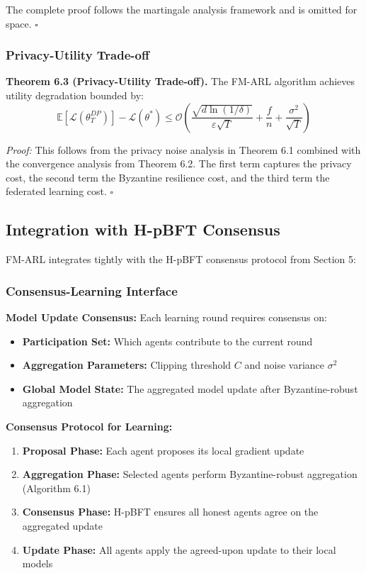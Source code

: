 \documentclass[conference]{IEEEtran}
\newcommand{\bigO}{\mathcal{O}}
\newcommand{\epsilon}{\varepsilon}
\begin{document}
The complete proof follows the martingale analysis framework and is omitted for space. $\square$

\subsubsection{Privacy-Utility Trade-off}

\textbf{Theorem 6.3 (Privacy-Utility Trade-off).} The FM-ARL algorithm achieves utility degradation bounded by:
\begin{equation}
\mathbb{E}[\mathcal{L}(\theta_T^{DP})] - \mathcal{L}(\theta^*) \leq \bigO\left(\frac{\sqrt{d \ln(1/\delta)}}{\epsilon \sqrt{T}} + \frac{f}{n} + \frac{\sigma^2}{\sqrt{T}}\right)
\end{equation}

\textit{Proof:} This follows from the privacy noise analysis in Theorem 6.1 combined with the convergence analysis from Theorem 6.2. The first term captures the privacy cost, the second term the Byzantine resilience cost, and the third term the federated learning cost. $\square$

\subsection{Integration with H-pBFT Consensus}

FM-ARL integrates tightly with the H-pBFT consensus protocol from Section 5:

\subsubsection{Consensus-Learning Interface}

\textbf{Model Update Consensus:} Each learning round requires consensus on:
\begin{itemize}
    \item \textbf{Participation Set:} Which agents contribute to the current round
    \item \textbf{Aggregation Parameters:} Clipping threshold $C$ and noise variance $\sigma^2$
    \item \textbf{Global Model State:} The aggregated model update after Byzantine-robust aggregation
\end{itemize}

\textbf{Consensus Protocol for Learning:}
\begin{enumerate}
    \item \textbf{Proposal Phase:} Each agent proposes its local gradient update
    \item \textbf{Aggregation Phase:} Selected agents perform Byzantine-robust aggregation (Algorithm 6.1)
    \item \textbf{Consensus Phase:} H-pBFT ensures all honest agents agree on the aggregated update
    \item \textbf{Update Phase:} All agents apply the agreed-upon update to their local models
\end{enumerate}
\end{document}
